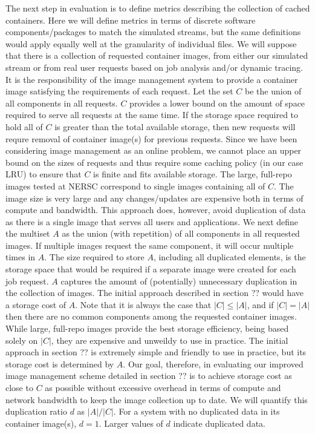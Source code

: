 \documentclass[conference]{IEEEtran}
\begin{document}
The next step in evaluation is to define metrics describing the collection of cached containers.
Here we will define metrics in terms of discrete software components/packages to match the simulated streams,
but the same definitions would apply equally well at the granularity of individual files.
We will suppose that there is a collection of requested container images,
from either our simulated stream or from real user requests based on job analysis and/or dynamic tracing.
It is the responsibility of the image management system to provide a container image satisfying the requirements of each request.
Let the set $C$ be the union of all components in all requests.
$C$ provides a lower bound on the amount of space required to serve all requests at the same time.
If the storage space required to hold all of $C$ is greater than the total available storage,
then new requests will requre removal of container image(s) for previous requests.
Since we have been considering image management as an online problem,
we cannot place an upper bound on the sizes of requests and thus require some caching policy
(in our case LRU) to ensure that $C$ is finite and fits available storage.
The large, full-repo images tested at NERSC correspond to single images containing all of $C$.
The image size is very large and any changes/updates are expensive both in terms of compute and bandwidth.
This approach does, however,
avoid duplication of data as there is a single image that serves all users and applications.
We next define the multiset $A$ as the union (with repetition) of all components in all requested images.
If multiple images request the same component,
it will occur multiple times in $A$.
The size required to store $A$,
including all duplicated elements,
is the storage space that would be required if a separate image were created for each job request.
$A$ captures the amount of (potentially) unnecessary duplication in the collection of images.
The initial approach described in section ?? would have a storage cost of $A$.
Note that it is always the case that $|C| \leq |A|$,
and if $|C| = |A|$ then there are no common components among the requested container images.
While large, full-repo images provide the best storage efficiency, being based solely on $|C|$,
they are expensive and unweildy to use in practice.
The initial approach in section ?? is extremely simple and friendly to use in practice,
but its storage cost is determined by $A$.
Our goal, therefore, in evaluating our improved image management scheme detailed in section ?? is to achieve storage cost as close to $C$ as possible without excessive overhead in terms of compute and network bandwidth to keep the image collection up to date.
We will quantify this duplication ratio $d$ as $|A| / |C|$.
For a system with no duplicated data in its container image(s),
$d=1$.
Larger values of $d$ indicate duplicated data.
\end{document}
